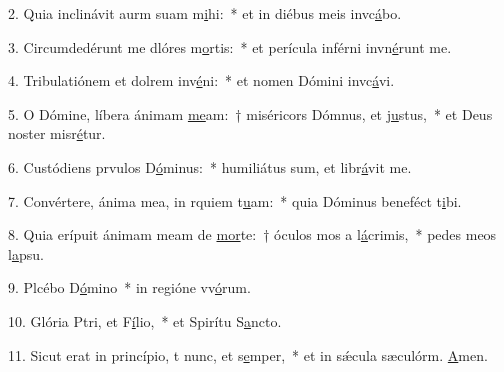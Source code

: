 2. Quia inclinávit aurm suam m\uline{i}hi:~* et in diébus meis invc\uline{á}bo.\par 
3. Circumdedérunt me dlóres m\uline{o}rtis:~* et perícula inférni invn\uline{é}runt me.\par 
4. Tribulatiónem et dolrem inv\uline{é}ni:~* et nomen Dómini invc\uline{á}vi.\par 
5. O Dómine, líbera ánimam \uline{me}am:~† miséricors Dómnus, et j\uline{u}stus,~* et Deus noster misr\uline{é}tur.\par 
6. Custódiens prvulos D\uline{ó}minus:~* humiliátus sum, et libr\uline{á}vit me.\par 
7. Convértere, ánima mea, in rquiem t\uline{u}am:~* quia Dóminus beneféct t\uline{i}bi.\par 
8. Quia erípuit ánimam meam de \uline{mor}te:~† óculos mos a l\uline{á}crimis,~* pedes meos  l\uline{a}psu.\par 
9. Plcébo D\uline{ó}mino~* in regióne vv\uline{ó}rum.\par 
10. Glória Ptri, et F\uline{í}lio,~* et Spirítu S\uline{a}ncto.\par 
11. Sicut erat in princípio, t nunc, et s\uline{e}mper,~* et in sǽcula sæculórm. \uline{A}men.\par 
